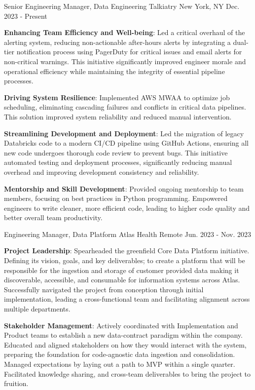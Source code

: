 \begin{cventries}
  \cventry
    {Senior Engineering Manager, Data Engineering}
    {Talkiatry}
    {New York, NY}
    {Dec. 2023 - Present}
    {
      \begin{cvitems}
          \item {\textbf{Enhancing Team Efficiency and Well-being}: Led a critical overhaul of the alerting system, reducing non-actionable after-hours alerts by integrating a dual-tier notification process using PagerDuty for critical issues and email alerts for non-critical warnings. This initiative significantly improved engineer morale and operational efficiency while maintaining the integrity of essential pipeline processes.}
          \item {\textbf{Driving System Resilience}: Implemented AWS MWAA to optimize job scheduling, eliminating cascading failures and conflicts in critical data pipelines. This solution improved system reliability and reduced manual intervention.}
          \item {\textbf{Streamlining Development and Deployment}: Led the migration of legacy Databricks code to a modern CI/CD pipeline using GitHub Actions, ensuring all new code undergoes thorough code review to prevent bugs. This initiative automated testing and deployment processes, significantly reducing manual overhead and improving development consistency and reliability.}
          \item {\textbf{Mentorship and Skill Development}: Provided ongoing mentorship to team members, focusing on best practices in Python programming. Empowered engineers to write cleaner, more efficient code, leading to higher code quality and better overall team productivity.}
      \end{cvitems}
    }
  \cventry
    {Engineering Manager, Data Platform}
    {Atlas Health}
    {Remote}
    {Jun. 2023 - Nov. 2023}
    {
      \begin{cvitems}
          \item {\textbf{Project Leadership}: Spearheaded the greenfield Core Data Platform initiative. Defining its vision, goals, and key deliverables; to create a platform that will be responsible for the ingestion and storage of customer provided data making it discoverable, accessible, and consumable for information systems across Atlas. Successfully navigated the project from conception through initial implementation, leading a cross-functional team and facilitating alignment across multiple departments.}
          \item {\textbf{Stakeholder Management}: Actively coordinated with Implementation and Product teams to establish a new data-contract paradigm within the company. Educated and aligned stakeholders on how they would interact with the system, preparing the foundation for code-agnostic data ingestion and consolidation. Managed expectations by laying out a path to MVP within a single quarter. Facilitated knowledge sharing, and cross-team deliverables to bring the project to fruition.}

\end{cvitems}}
\end{cventries}
